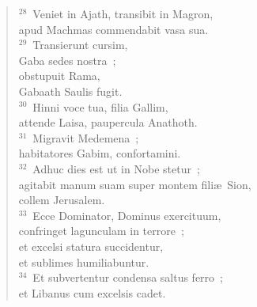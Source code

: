 \begin{verse}${}^{28}$~Veniet in Ajath, transibit in Magron,\\ apud Machmas commendabit vasa sua.\\
${}^{29}$~Transierunt cursim,\\ Gaba sedes nostra~;\\ obstupuit Rama,\\ Gabaath Saulis fugit.\\
${}^{30}$~Hinni voce tua, filia Gallim,\\ attende Laisa, paupercula Anathoth.\\
${}^{31}$~Migravit Medemena~;\\ habitatores Gabim, confortamini.\\
${}^{32}$~Adhuc dies est ut in Nobe stetur~;\\ agitabit manum suam super montem fili\ae\ Sion,\\ collem Jerusalem.\\
${}^{33}$~Ecce Dominator, Dominus exercituum,\\ confringet lagunculam in terrore~;\\ et excelsi statura succidentur,\\ et sublimes humiliabuntur.\\
${}^{34}$~Et subvertentur condensa saltus ferro~;\\ et Libanus cum excelsis cadet.\end{verse}


